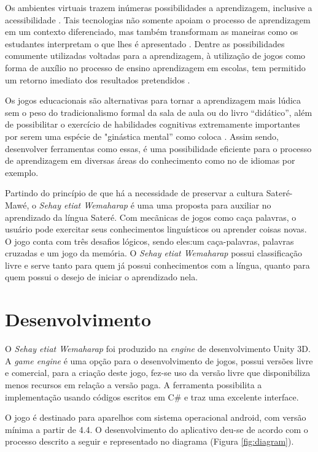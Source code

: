 \documentclass[12pt]{article}
\begin{document}
		Os ambientes virtuais trazem inúmeras possibilidades a aprendizagem, inclusive a acessibilidade \cite{kozma2003}. Tais tecnologias não somente apoiam o processo de aprendizagem em um contexto diferenciado, mas também transformam as maneiras como os estudantes interpretam o que lhes é apresentado \cite{saljo2010digital}.  Dentre as possibilidades comumente utilizadas voltadas para a aprendizagem, à utilização de jogos como forma de auxílio no processo de ensino aprendizagem em escolas, tem permitido um retorno imediato dos resultados pretendidos \cite{yamato2017amargana}. 
		
		Os jogos educacionais são alternativas para tornar a aprendizagem mais lúdica sem o peso do tradicionalismo formal da sala de aula ou do livro “didático”, além de possibilitar o exercício de habilidades cognitivas extremamente importantes por serem uma espécie de "ginástica mental” como coloca \cite{tarouco2004jogos}. Assim sendo, desenvolver ferramentas como essas, é uma possibilidade eficiente para o processo de aprendizagem em diversas áreas do conhecimento como no de idiomas por exemplo.
		
		Partindo do princípio de que há a necessidade de preservar a cultura Sateré-Mawé, o \textit{Sehay etiat Wemaharap} é uma uma proposta para auxiliar no aprendizado da língua Sateré. Com mecãnicas de jogos como caça palavras, o usuário pode exercitar seus conhecimentos linguísticos ou aprender coisas novas. O jogo conta com três desafios lógicos, sendo eles:um caça-palavras, palavras cruzadas e um jogo da memória. O \textit{Sehay etiat Wemaharap} possui classificação livre e serve tanto para quem já possui conhecimentos com a língua, quanto para quem possui o desejo de iniciar o aprendizado nela.

	\section{Desenvolvimento} \label{sec:firstpage}
		O \textit{Sehay etiat Wemaharap} foi produzido na \textit{engine} de desenvolvimento Unity 3D. A \textit{game engine} é uma opção para o desenvolvimento de jogos, possui versões livre e comercial, para a criação deste jogo, fez-se uso da versão livre que disponibiliza menos recursos em relação a versão paga. A ferramenta possibilita a implementação usando códigos escritos em C\# e traz uma excelente interface.
		
		O jogo é destinado para aparelhos com sistema operacional android, com versão mínima a partir de 4.4. O desenvolvimento do aplicativo deu-se de acordo com o processo descrito a seguir e representado no diagrama (Figura \ref{fig:diagram}).
		
\end{document}
